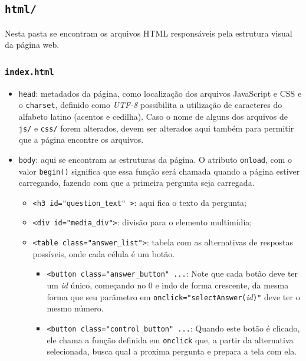 \documentclass{article}
\begin{document}
\subsection{\texttt{html/}}
Nesta pasta se encontram os arquivos HTML responsáveis pela estrutura visual da página web.

\subsubsection{\texttt{index.html}}

\begin{itemize}
\item \texttt{head}: metadados da página, como localização dos arquivos JavaScript e CSS e o \texttt{charset}, definido como \textit{UTF-8} possibilita a utilização de caracteres do alfabeto latino (acentos e cedilha). Caso o nome de alguns dos arquivos de \texttt{js/} e \texttt{css/} forem alterados, devem ser alterados aqui também para permitir que a página encontre os arquivos.

\item\texttt{body}: aqui se encontram as estruturas da página. O atributo \texttt{onload}, com o valor \texttt{begin()} significa que essa função será chamada quando a página estiver carregando, fazendo com que a primeira pergunta seja carregada.
\begin{itemize}

\item \texttt{<h3 id="question\_text" \textgreater}: aqui fica o texto da pergunta;

\item \texttt{<div id="media\_div"\textgreater}: divisão para o elemento multimídia;

\item \texttt{<table class="answer\_list"\textgreater}: tabela com as alternativas de respostas possíveis, onde cada célula é um botão. 

\begin{itemize}

\item \texttt{<button class="answer\_button" ...}: Note que cada botão deve ter um \textit{id} único, começando no 0 e indo de forma crescente, da mesma forma que seu parâmetro em \texttt{onclick="selectAnswer(}\textit{id}\texttt{)"} deve ter o mesmo número.

\item \texttt{<button class="control\_button" ...}: Quando este botão é clicado, ele chama a função definida em \texttt{onclick} que, a partir da alternativa selecionada, busca qual a proxima pergunta e prepara a tela com ela.

\end{itemize}

\end{itemize}

\end{itemize}
\end{document}
